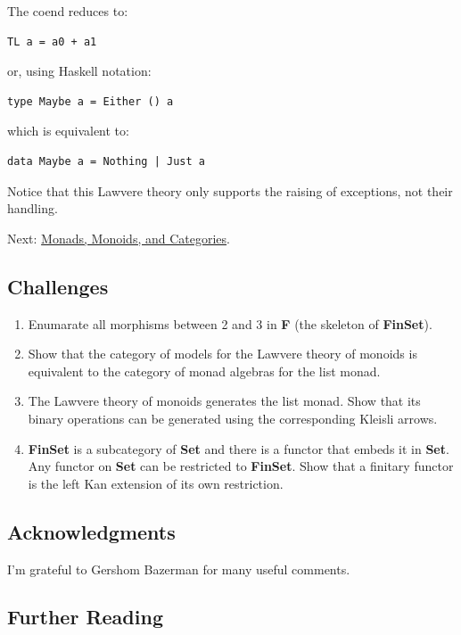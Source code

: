 The coend reduces to:

\begin{verbatim}
TL a = a0 + a1
\end{verbatim}

or, using Haskell notation:

\begin{verbatim}
type Maybe a = Either () a
\end{verbatim}

which is equivalent to:

\begin{verbatim}
data Maybe a = Nothing | Just a
\end{verbatim}

Notice that this Lawvere theory only supports the raising of exceptions,
not their handling.

Next:
\href{https://bartoszmilewski.com/2017/09/06/monads-monoids-and-categories/}{Monads,
Monoids, and Categories}.

\subsection{Challenges}\label{challenges}

\begin{enumerate}
\tightlist
\item
  Enumarate all morphisms between 2 and 3 in \textbf{F} (the skeleton of
  \textbf{FinSet}).
\item
  Show that the category of models for the Lawvere theory of monoids is
  equivalent to the category of monad algebras for the list monad.
\item
  The Lawvere theory of monoids generates the list monad. Show that its
  binary operations can be generated using the corresponding Kleisli
  arrows.
\item
  \textbf{FinSet} is a subcategory of \textbf{Set} and there is a
  functor that embeds it in \textbf{Set}. Any functor on \textbf{Set}
  can be restricted to \textbf{FinSet}. Show that a finitary functor is
  the left Kan extension of its own restriction.
\end{enumerate}

\subsection{Acknowledgments}\label{acknowledgments}

I'm grateful to Gershom Bazerman for many useful comments.

\subsection{Further Reading}\label{further-reading}
